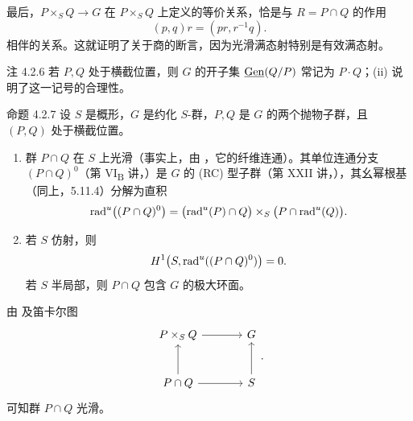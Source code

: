 最后，\(P\times_SQ\to G\) 在 \(P\times_SQ\) 上定义的等价关系，恰是与 \(R=P\cap Q\) 的作用
\[
 (p,q)r=(pr,r^{-1}q).
\]
相伴的关系。这就证明了关于商的断言，因为光滑满态射特别是有效满态射。
\SGAQED

\begin{sgastatement}{注 4.2.6}
若 \(P,Q\) 处于横截位置，则 \(G\) 的开子集 \(\underline{\operatorname{Gen}}(Q/P)\) 常记为 \(P\cdot Q\)；\textup{(ii)} 说明了这一记号的合理性。
\end{sgastatement}

\begin{sgastatement}{命题 4.2.7}
设 \(S\) 是概形，\(G\) 是约化 \(S\)-群，\(P,Q\) 是 \(G\) 的两个抛物子群，且 \((P,Q)\) 处于横截位置。
\begin{enumerate}[label=\textup{(\roman*)}]
\item 群 \(P\cap Q\) 在 \(S\) 上光滑（事实上，由 ，它的纤维连通）。其单位连通分支 \((P\cap Q)^0\)（第 VI\textsubscript{B} 讲，）是 \(G\) 的 \textup{(RC)} 型子群（第 XXII 讲，），其幺幂根基（同上，5.11.4）分解为直积
\[
 \operatorname{rad}^u\bigl((P\cap Q)^0\bigr)
 =
 \bigl(\operatorname{rad}^u(P)\cap Q\bigr)
 \times_S
 \bigl(P\cap\operatorname{rad}^u(Q)\bigr).
\]
\item 若 \(S\) 仿射，则
\[
 H^1\bigl(S,\operatorname{rad}^u((P\cap Q)^0)\bigr)=0.
\]
若 \(S\) 半局部，则 \(P\cap Q\) 包含 \(G\) 的极大环面。
\end{enumerate}
\end{sgastatement}

\SGAProof
由 \textup{} 及笛卡尔图
\[
\begin{tikzcd}[column sep=large,row sep=large]
 P\times_SQ \arrow[r] & G\\
 P\cap Q \arrow[u] \arrow[r] & S\arrow[u]
\end{tikzcd}.
\]
可知群 \(P\cap Q\) 光滑。

